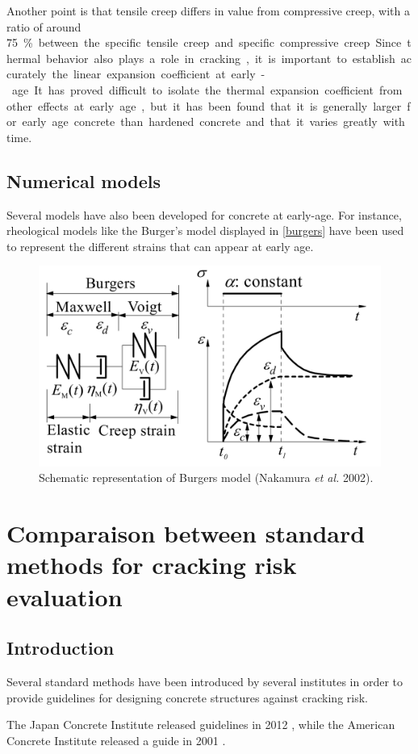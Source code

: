 \documentclass{memoir}
\begin{document}
Another point is that tensile creep differs in value from compressive creep,
with a ratio of around \SI{75}\percent between the specific tensile creep and
specific compressive creep.

Since thermal behavior also plays a role in cracking, it is important to
establish accurately the linear expansion coefficient at early-age. It has
proved difficult to isolate the thermal expansion coefficient from other
effects at early age, but it has been found that it is generally larger for
early age concrete than hardened concrete and that it varies greatly with time.

\subsection{Numerical models}

Several models have also been developed for concrete at early-age. For
instance, rheological models like the Burger's model displayed in
\autoref{burgers} have been used to represent the different strains that can
appear at early age.

\begin{figure}
  \centering
  \includegraphics[width=.5\linewidth]{burgers}
  \caption{Schematic representation of Burgers model (Nakamura \textit{et al.}
  2002).}\label{burgers}
\end{figure}

\section{Comparaison between standard methods for cracking risk evaluation}
\subsection{Introduction}

Several standard methods have been introduced by several institutes in order to
provide guidelines for designing concrete structures against cracking risk.

The Japan Concrete Institute released guidelines in 2012 \cite{jci}, while the
American Concrete Institute released a guide in 2001 \cite{aci}.
\end{document}
